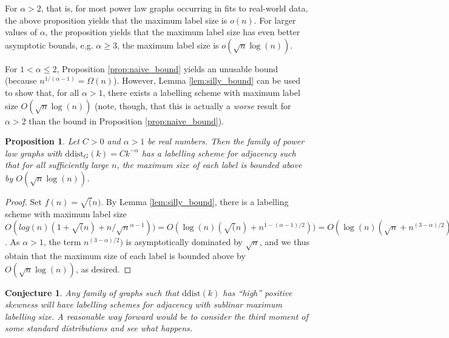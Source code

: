 \documentclass{article}
\newtheorem{proposition}{Proposition}
\newtheorem{conjecture}{Conjecture}
\begin{document}
For $\alpha > 2$, that is, for most power law graphs occurring in fits to real-world data, the above proposition
yields that the maximum label size is $o(n)$. For larger values of $\alpha$,
the proposition yields that the maximum label size has even better asymptotic bounds,
e.g. $\alpha \geq 3$, the maximum label size is $o(\sqrt{n} \log(n))$.

For $1 < \alpha \leq 2$, Proposition \ref{prop:naive_bound} yields an unusable
bound (because $n^{1/(\alpha - 1)} = \Omega(n)$). However, Lemma \ref{lem:silly_bound}
can be used to show that, for all $\alpha > 1$, there exists a labelling scheme with maximum label size $O(\sqrt{n} \log(n))$ (note, though, that this is actually a \emph{worse} result for $\alpha > 2$ than the bound in Proposition 
\ref{prop:naive_bound}).


\begin{proposition}
Let $C > 0$ and $\alpha > 1$ be real numbers. Then the family of  power law graphs
with $\mathrm{ddist}_G(k) = C k^{-\alpha}$ has a labelling scheme for adjacency
such that for all sufficiently large $n$, the maximum size of each label
is bounded above by $O(\sqrt{n}\log(n))$.
\end{proposition}

\begin{proof}
Set $f(n) = \sqrt(n)$. By Lemma \ref{lem:silly_bound}, there is a labelling scheme with maximum label size
$O(log(n) (1 +\sqrt(n) + n/\sqrt{n}^{\alpha - 1})) = O(\log(n)(\sqrt(n) + n^{1 - (\alpha - 1)/2}))
= O(\log(n)(\sqrt{n} + n^{(3-\alpha)/2}))$. As $\alpha > 1$,
the term $n^{(3-\alpha)/2})$ is asymptotically dominated by $\sqrt{n}$,
and we thus obtain that the maximum size of each label is bounded above by $O(\sqrt{n}\log(n))$, as desired.
\end{proof}

\begin{conjecture}
Any family of graphs such that $\mathrm{ddist}(k)$ has ``high'' positive skewness will have labelling schemes for adjacency with
sublinar maximum labelling size. A reasonable way forward would be to consider the third moment of some standard distributions
and see what happens.
\end{conjecture}
\end{document}
